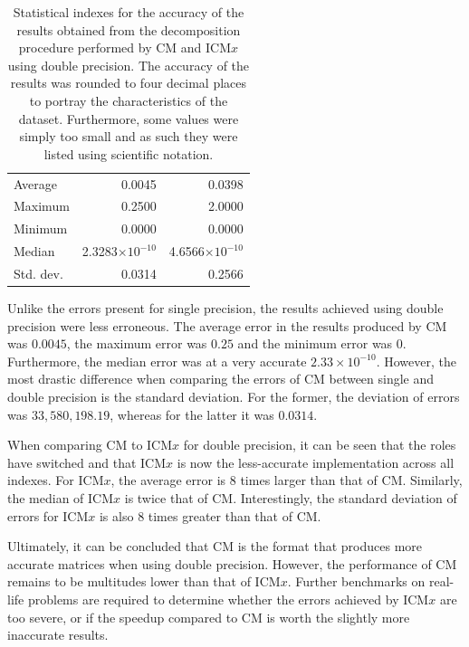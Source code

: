 \begin{table}[h!]
	\centering
	\renewcommand{\arraystretch}{1.5}
	\begin{tabular}{|>{\footnotesize}l|>{\raggedleft\arraybackslash\footnotesize}r|>{\raggedleft\arraybackslash\footnotesize}r|}
		\hline
		\multicolumn{1}{|>{\centering\footnotesize}c|}{Accuracy index} & \multicolumn{1}{>{\centering\footnotesize}c|}{CM} & \multicolumn{1}{>{\centering\footnotesize}c|}{ICM$ x $} \\
		\hline
		Average   & 0.0045                   & 0.0398                   \\
		Maximum   & 0.2500                   & 2.0000                   \\
		Minimum   & 0.0000                   & 0.0000                   \\
		Median    & 2.3283$\times 10^{-10}$  & 4.6566$\times 10^{-10}$ \\
		Std. dev. & 0.0314                   & 0.2566                   \\
		\hline
	\end{tabular}
	\caption{Statistical indexes for the accuracy of the results obtained from the decomposition procedure performed by CM and ICM$ x $ using double precision. The accuracy of the results was rounded to four decimal places to portray the characteristics of the dataset. Furthermore, some values were simply too small and as such they were listed using scientific notation.}
	\label{Table:benchmark-results-performance-of-implementations-across-all-matrices-accuracy-statistical-indexes-double-precision}
\end{table}

Unlike the errors present for single precision, the results achieved using double precision were less erroneous. The average error in the results produced by CM was $ 0.0045 $, the maximum error was $ 0.25 $ and the minimum error was $ 0 $. Furthermore, the median error was at a very accurate $2.33\times 10^{-10}$. However, the most drastic difference when comparing the errors of CM between single and double precision is the standard deviation. For the former, the deviation of errors was $ 33,580,198.19 $, whereas for the latter it was $ 0.0314 $.
\par When comparing CM to ICM$ x $ for double precision, it can be seen that the roles have switched and that ICM$ x $ is now the less-accurate implementation across all indexes. For ICM$ x $, the average error is $ 8 $ times larger than that of CM. Similarly, the median of ICM$ x $ is twice that of CM. Interestingly, the standard deviation of errors for ICM$ x $ is also $ 8 $ times greater than that of CM.
\par Ultimately, it can be concluded that CM is the format that produces more accurate matrices when using double precision. However, the performance of CM remains to be multitudes lower than that of ICM$ x $. Further benchmarks on real-life problems are required to determine whether the errors achieved by ICM$ x $ are too severe, or if the speedup compared to CM is worth the slightly more inaccurate results.


